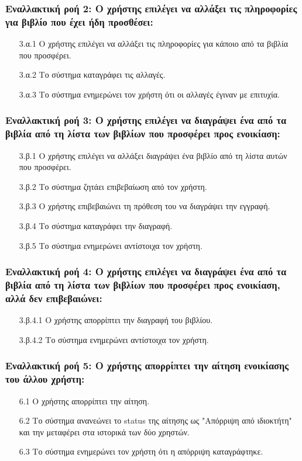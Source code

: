 \documentclass[12pt,a4paper]{article}
\begin{document}
\subsubsection*{Εναλλακτική ροή 2: Ο χρήστης επιλέγει να αλλάξει τις πληροφορίες για βιβλίο που έχει ήδη προσθέσει:}
\begin{enumerate}
    \item [3.α.1] Ο χρήστης επιλέγει να αλλάξει τις πληροφορίες για κάποιο από τα βιβλία που προσφέρει.
    \item [3.α.2] Το σύστημα καταγράφει τις αλλαγές.
    \item [3.α.3] Το σύστημα ενημερώνει τον χρήστη ότι οι αλλαγές έγιναν με επιτυχία.
\end{enumerate}

\subsubsection*{Εναλλακτική ροή 3: Ο χρήστης επιλέγει να διαγράψει ένα από τα βιβλία από τη λίστα των βιβλίων που προσφέρει προς ενοικίαση:}
\begin{enumerate}
    \item [3.β.1] Ο χρήστης επιλέγει να αλλάξει διαγράψει ένα βιβλίο από τη λίστα αυτών που προσφέρει.
    \item [3.β.2] Το σύστημα ζητάει επιβεβαίωση από τον χρήστη.
    \item [3.β.3] Ο χρήστης επιβεβαιώνει τη πρόθεση του να διαγράψει την εγγραφή.
    \item [3.β.4] Το σύστημα καταγράφει την διαγραφή.
    \item [3.β.5] Το σύστημα ενημερώνει αντίστοιχα τον χρήστη.
\end{enumerate}

\subsubsection*{Εναλλακτική ροή 4: Ο χρήστης επιλέγει να διαγράψει ένα από τα βιβλία από τη λίστα των βιβλίων που προσφέρει προς ενοικίαση, αλλά δεν επιβεβαιώνει:}
\begin{enumerate}
    \item [3.β.4.1] Ο χρήστης απορρίπτει την διαγραφή του βιβλίου.
    \item [3.β.4.2] Το σύστημα ενημερώνει αντίστοιχα τον χρήστη.
\end{enumerate}

\subsubsection*{Εναλλακτική ροή 5: Ο χρήστης απορρίπτει την αίτηση ενοικίασης του άλλου χρήστη:}
\begin{enumerate}
    \item [6.1] Ο χρήστης απορρίπτει την αίτηση.
    \item [6.2] Το σύστημα ανανεώνει το status της αίτησης ως "Απόρριψη από ιδιοκτήτη" και την μεταφέρει στα ιστορικά των δύο χρηστών.
    \item [6.3] Το σύστημα ενημερώνει τον χρήστη ότι η απόρριψη καταγράφτηκε.
\end{enumerate}
\end{document}
